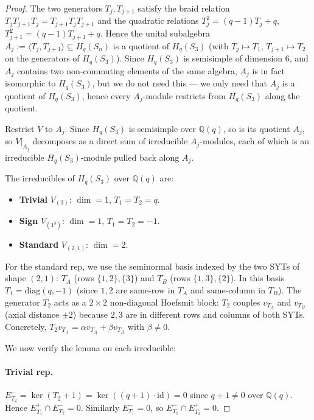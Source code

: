 \documentclass[11pt]{article}
\theoremstyle{definition}
\begin{document}
\begin{proof}
The two generators $T_j, T_{j+1}$ satisfy the braid relation
$T_j T_{j+1} T_j = T_{j+1} T_j T_{j+1}$ and the quadratic relations
$T_j^2 = (q-1) T_j + q$, $T_{j+1}^2 = (q-1) T_{j+1} + q$.  Hence
the unital subalgebra $A_j := \langle T_j, T_{j+1}\rangle \subseteq
H_q(S_n)$ is a quotient of $H_q(S_3)$ (with $T_j \mapsto T_1$,
$T_{j+1} \mapsto T_2$ on the generators of $H_q(S_3)$).
Since $H_q(S_3)$ is semisimple of dimension $6$, and $A_j$ contains
two non-commuting elements of the same algebra, $A_j$ is in fact
isomorphic to $H_q(S_3)$, but we do not need this --- we only need
that $A_j$ is a quotient of $H_q(S_3)$, hence every $A_j$-module
restricts from $H_q(S_3)$ along the quotient.

Restrict $V$ to $A_j$.  Since $H_q(S_3)$ is semisimple over
$\mathbb{Q}(q)$, so is its quotient $A_j$, so $V|_{A_j}$ decomposes
as a direct sum of irreducible $A_j$-modules, each of which is an
irreducible $H_q(S_3)$-module pulled back along $A_j$.

The irreducibles of $H_q(S_3)$ over $\mathbb{Q}(q)$ are:
\begin{itemize}[leftmargin=2em,topsep=0.3em,itemsep=0.2em]
\item \textbf{Trivial} $V_{(3)}$: $\dim = 1$, $T_1 = T_2 = q$.
\item \textbf{Sign} $V_{(1^3)}$: $\dim = 1$, $T_1 = T_2 = -1$.
\item \textbf{Standard} $V_{(2,1)}$: $\dim = 2$.
\end{itemize}
For the standard rep, we use the seminormal basis indexed by the
two SYTs of shape $(2,1)$:
$T_A$ (rows $\{1,2\},\{3\}$) and $T_B$ (rows $\{1,3\},\{2\}$).
In this basis $T_1 = \mathrm{diag}(q, -1)$
(since $1,2$ are same-row in $T_A$ and same-column in $T_B$).  The
generator $T_2$ acts as a $2 \times 2$ non-diagonal Hoefsmit block:
$T_2$ couples $v_{T_A}$ and $v_{T_B}$ (axial distance $\pm 2$)
because $2, 3$ are in different rows and columns of both SYTs.
Concretely, $T_2 v_{T_A} = \alpha v_{T_A} + \beta v_{T_B}$ with
$\beta \ne 0$.

We now verify the lemma on each irreducible:

\paragraph{Trivial rep.} $E_{T_2}^- = \ker(T_2 + 1) = \ker((q+1)\cdot
\mathrm{id}) = 0$ since $q + 1 \ne 0$ over $\mathbb{Q}(q)$.  Hence
$E_{T_1}^+ \cap E_{T_2}^- = 0$.  Similarly $E_{T_1}^- = 0$, so
$E_{T_1}^- \cap E_{T_2}^+ = 0$.


\end{proof}
\end{document}

